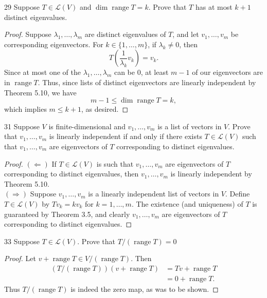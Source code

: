 \documentclass[11pt]{extarticle}
\newenvironment{problem}[1]{\begin{prob*}{#1}{}}{\end{prob*}}
\newcommand{\Hom}{\mathcal{L}}
\DeclareMathOperator{\Range}{range}
\begin{document}
\begin{problem}{29}
Suppose $T\in\Hom(V)$ and $\dim\Range T = k$.  Prove that $T$ has at most $k + 1$ distinct eigenvalues.
\end{problem}
\begin{proof}
Suppose $\lambda_1,\dots, \lambda_m$ are distinct eigenvalues of $T$, and let $v_1,\dots, v_m$ be corresponding eigenvectors.  For $k\in\{1,\dots,m\}$, if $\lambda_k\neq 0$, then 
\begin{equation*}
T\left(\frac{1}{\lambda_k} v_k\right) = v_k.
\end{equation*}
Since at most one of the $\lambda_1,\dots, \lambda_m$ can be $0$, at least $m-1$ of our eigenvectors are in $\Range T$.  Thus, since lists of distinct eigenvectors are linearly independent by Theorem 5.10, we have
\begin{equation*}
m-1\leq \dim\Range T = k,
\end{equation*}
which implies $m\leq k+1$, as desired.
\end{proof}

\begin{problem}{31}
Suppose $V$ is finite-dimensional and $v_1,\dots,v_m$ is a list of vectors in $V$.  Prove that $v_1,\dots,v_m$ is linearly independent if and only if there exists $T\in\Hom(V)$ such that $v_1,\dots,v_m$ are eigenvectors of $T$ corresponding to distinct eigenvalues.
\end{problem}
\begin{proof}
$(\Leftarrow)$ If $T\in \Hom(V)$ is such that $v_1,\dots,v_m$ are eigenvectors of $T$ corresponding to distinct eigenvalues, then $v_1,\dots,v_m$ is linearly independent by Theorem 5.10.\\
\indent $(\Rightarrow)$ Suppose $v_1,\dots,v_m$ is a linearly independent list of vectors in $V$.  Define $T\in\Hom(V)$ by $Tv_k = kv_k$ for $k = 1,\dots, m$.  The existence (and uniqueness) of $T$ is guaranteed by Theorem 3.5, and clearly $v_1,\dots, v_m$ are eigenvectors of $T$ corresponding to distinct eigenvalues.  
\end{proof}

\begin{problem}{33}
Suppose $T\in\Hom(V)$.  Prove that $T/(\Range T) = 0$ 
\end{problem}
\begin{proof}
Let $v + \Range T\in V/(\Range T)$.  Then
\begin{align*}
(T/(\Range T))(v + \Range T) &= Tv + \Range T\\
&= 0 + \Range T.
\end{align*}
Thus $T/(\Range T)$ is indeed the zero map, as was to be shown.
\end{proof}
\end{document}
